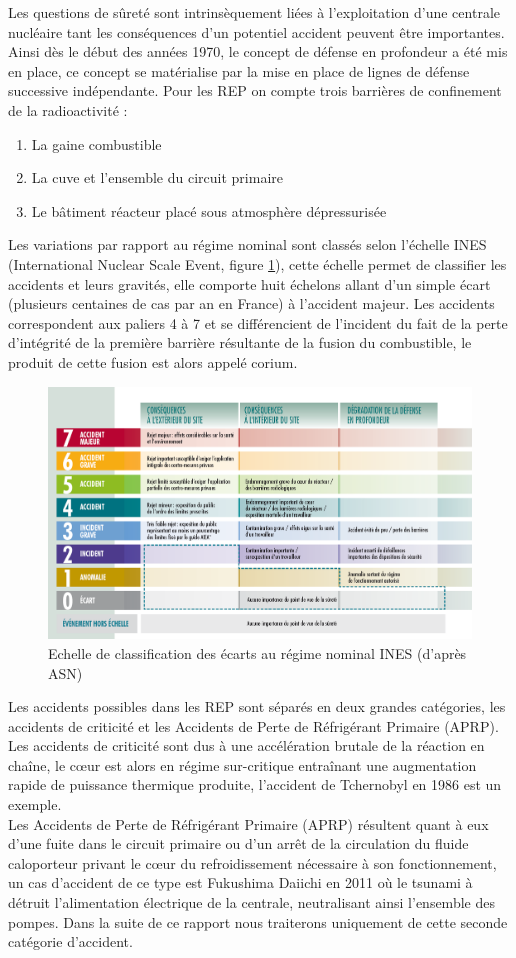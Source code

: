 Les questions de sûreté sont intrinsèquement liées à l'exploitation d'une centrale nucléaire tant les conséquences d'un potentiel accident peuvent être importantes. Ainsi dès le début des années 1970, le concept de défense en profondeur a été mis en place, ce concept se matérialise par la mise en place de lignes de défense successive indépendante. Pour les REP on compte trois barrières de confinement de la radioactivité :
\begin{enumerate}
	\item La gaine combustible
	\item La cuve et l'ensemble du circuit primaire
	\item Le bâtiment réacteur placé sous atmosphère dépressurisée
\end{enumerate}
Les variations par rapport au régime nominal sont classés selon l'échelle INES (International Nuclear Scale Event, figure \ref{fig:echelle-ines-article}), cette échelle permet de classifier les accidents et leurs gravités, elle comporte huit échelons allant d'un simple écart (plusieurs centaines de cas par an en France) à l'accident majeur. Les accidents correspondent aux paliers 4 à 7 et se différencient de l'incident du fait de la perte d'intégrité de la première barrière résultante de la fusion du combustible, le produit de cette fusion est alors appelé corium.
\begin{figure}[H]
	\centering
	\includegraphics[width=0.7\linewidth]{figure/echelle-ines-article}
	\caption[Echelle de classification des écarts au régime nominal INES]{Echelle de classification des écarts au régime nominal INES (d'après ASN)}
	\label{fig:echelle-ines-article}
\end{figure}
Les accidents possibles dans les REP sont séparés en deux grandes catégories, les accidents de criticité et les Accidents de Perte de Réfrigérant Primaire (APRP). Les accidents de criticité sont dus à une accélération brutale de la réaction en chaîne, le c\oe ur est alors en régime sur-critique entraînant une augmentation rapide de puissance thermique produite, l'accident de Tchernobyl en 1986 est un exemple.\\ Les Accidents de Perte de Réfrigérant Primaire (APRP) résultent quant à eux d'une fuite dans le circuit primaire ou d'un arrêt de la circulation du fluide caloporteur privant le c\oe ur du refroidissement nécessaire à son fonctionnement, un cas d'accident de ce type est Fukushima Daiichi en 2011 où le tsunami à détruit l'alimentation électrique de la centrale, neutralisant ainsi l'ensemble des pompes. Dans la suite de ce rapport nous traiterons uniquement de cette seconde catégorie d'accident.
